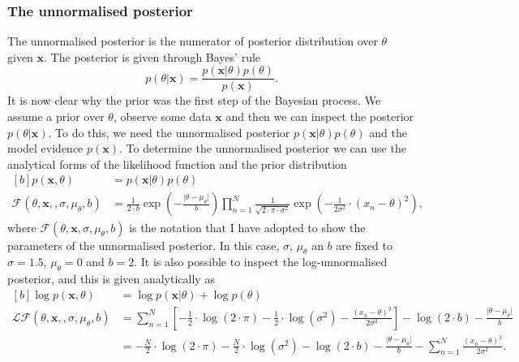 \documentclass{article}
\begin{document}
\subsubsection{The unnormalised posterior}
The unnormalised posterior is the numerator of posterior distribution over $\theta$ given $\mathbf{x}$. The posterior is given through Bayes' rule
\begin{equation}\label{eq:Q1_Bayes}
p(\theta \vert \mathbf{x}) = \frac{p(\mathbf{x}\vert\theta)p(\theta)}{p(\mathbf{x})}.
\end{equation}
It is now clear why the prior was the first step of the Bayesian process. We assume a prior over $\theta$, observe some data $\mathbf{x}$ and then we can inspect the posterior $p(\theta \vert \mathbf{x})$. To do this, we need the unnormalised posterior $p(\mathbf{x}\vert\theta)p(\theta)$ and the model evidence $p(\mathbf{x})$. To determine the unnormalised posterior we can use the analytical forms of the likelihood function and the prior distribution
\begin{equation}
\begin{aligned}[b]
p(\mathbf{x}, \theta) &= p(\mathbf{x}\vert\theta)p(\theta) \\
\mathcal{F}(\theta, \mathbf{x}, , \sigma, \mu_\theta, b) &= \frac{1}{2 \cdot b} \exp{ \left(- \frac{\vert \theta - \mu_\theta \vert}{b} \right)} \prod_{n=1}^{N} \frac{1}{ \sqrt{2 \cdot \pi \cdot \sigma^2}} \exp{ \left(-\frac{1}{2\sigma^2} \cdot \left( x_n - \theta \right)^2 \right)},
\end{aligned}
\end{equation}
where $\mathcal{F}(\theta, \mathbf{x}, \sigma, \mu_\theta, b)$ is the notation that I have adopted to show the parameters of the unnormalised posterior. In this case, $\sigma$, $\mu_\theta$ an $b$ are fixed to $\sigma =1.5$,  $\mu_\theta = 0$ and $b = 2$. It is also possible to inspect the log-unnormalised posterior, and this is given analytically as
\begin{equation}
\begin{aligned}[b]
\log p(\mathbf{x}, \theta) &= \log p(\mathbf{x}\vert\theta) + \log p(\theta) \\
\mathcal{LF}(\theta, \mathbf{x}, , \sigma, \mu_\theta, b) &= \sum_{n=1}^{N} \left[ -\frac{1}{2}\cdot\log (2\cdot \pi) - \frac{1}{2}\cdot\log (\sigma^2) - \frac{\left( x_n - \theta \right)^2}{2\sigma^2} \right]  -\log ( 2\cdot b ) - \frac{\vert \theta - \mu_\theta \vert}{b} \\ 
&= -\frac{N}{2} \cdot \log (2\cdot \pi) - \frac{N}{2} \cdot \log (\sigma^2) - \log ( 2\cdot b ) - \frac{\vert \theta - \mu_\theta \vert}{b} - \sum_{n=1}^{N} \frac{\left( x_n - \theta \right)^2}{2\sigma^2}.
\end{aligned}
\end{equation}
\end{document}
